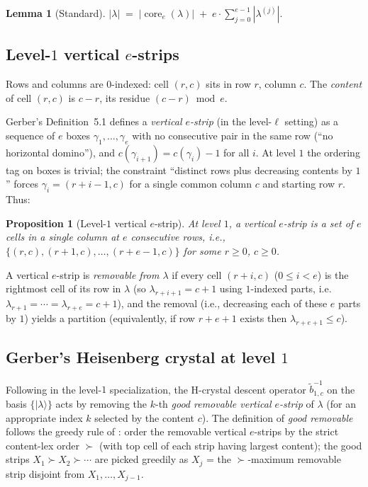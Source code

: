 \documentclass[11pt]{article}
\newtheorem{lemma}[theorem]{Lemma}
\newtheorem{proposition}[theorem]{Proposition}
\theoremstyle{definition}
\begin{document}
\begin{lemma}[Standard]
\label{lem:size-decomposition}
$\displaystyle |\lambda| \;=\; |\operatorname{core}_e(\lambda)| \;+\; e \cdot \sum_{j=0}^{e-1}
|\lambda^{(j)}|.$
\end{lemma}

\subsection{Level-$1$ vertical $e$-strips}
\label{sec:vertical-e-strips}

Rows and columns are $0$-indexed: cell $(r, c)$ sits in row $r$, column $c$.
The \emph{content} of cell $(r, c)$ is $c - r$, its residue $(c - r) \bmod e$.

Gerber's Definition~5.1 defines a \emph{vertical $e$-strip} (in the level-$\ell$
setting) as a sequence of $e$ boxes $\gamma_1, \ldots, \gamma_e$ with no
consecutive pair in the same row (``no horizontal domino''), and
$c(\gamma_{i+1}) = c(\gamma_i) - 1$ for all $i$. At level $1$ the ordering
tag on boxes is trivial; the constraint ``distinct rows plus decreasing
contents by $1$'' forces $\gamma_i = (r + i - 1, c)$ for a single common
column $c$ and starting row $r$. Thus:

\begin{proposition}[Level-$1$ vertical $e$-strip]
\label{prop:v-e-strip}
At level $1$, a vertical $e$-strip is a set of $e$ cells in a single column
at $e$ consecutive rows, i.e.,
$\{(r, c), (r+1, c), \ldots, (r+e-1, c)\}$
for some $r \ge 0$, $c \ge 0$.
\end{proposition}

A vertical $e$-strip is \emph{removable from $\lambda$} if every cell $(r+i, c)$
($0 \le i < e$) is the rightmost cell of its row in $\lambda$
(so $\lambda_{r+i+1} = c+1$ using $1$-indexed parts, i.e.\ $\lambda_{r+1} =
\cdots = \lambda_{r+e} = c+1$), and the removal (i.e., decreasing each of these
$e$ parts by $1$) yields a partition (equivalently, if row $r+e+1$ exists then
$\lambda_{r+e+1} \le c$).

\subsection{Gerber's Heisenberg crystal at level $1$}
\label{sec:H-crystal}

Following \cite[\S3.2 and Thm.~5.11]{Gerber} in the level-$1$ specialization,
the H-crystal descent operator $\widetilde b^{-1}_{1, c}$ on the basis
$\{|\lambda\rangle\}$ acts by removing the $k$-th \emph{good removable
vertical $e$-strip} of $\lambda$ (for an appropriate index $k$ selected by
the content $c$). The definition of \emph{good removable} follows the greedy
rule of \cite[Def.~5.5]{Gerber}: order the removable vertical $e$-strips by
the strict content-lex order $\succ$ (with top cell of each strip having
largest content); the good strips $X_1 \succ X_2 \succ \cdots$ are picked
greedily as $X_j$ = the $\succ$-maximum removable strip disjoint from
$X_1, \ldots, X_{j-1}$.
\end{document}
